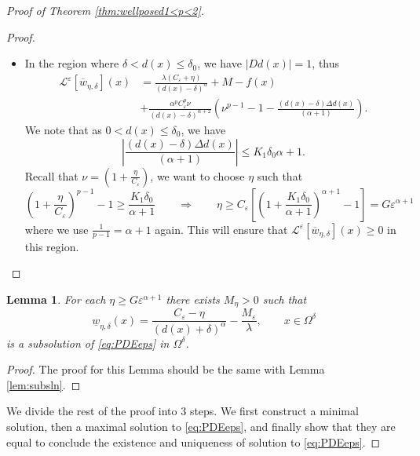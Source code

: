 \documentclass[11pt,reqno]{amsart}
\numberwithin{figure}{section}
\theoremstyle{plain}
\newtheorem{lem}[thm]{Lemma}
\theoremstyle{remark}
\numberwithin{equation}{section}
\begin{document}
\begin{appendices}
\begin{proof} [Proof of Theorem \ref{thm:wellposed1<p<2}]
\begin{proof}
\begin{itemize}
    \item In the region where $\delta < d(x)\leq \delta_0$, we have $|Dd(x)|=1$, thus
    \begin{align*}
         \mathcal{L}^\varepsilon\left[\overline{w}_{\eta,\delta}\right](x) &= \frac{\lambda(C_\varepsilon + \eta)}{(d(x)-\delta)^\alpha} + M - f(x)\\
         & + \frac{\alpha^p C_\varepsilon^p\nu }{(d(x)-\delta)^{\alpha+2}}\left(\nu^{p-1} - 1 - \frac{ (d(x)-\delta)\Delta d(x)}{(\alpha+1)}\right).
    \end{align*}
    We note that as $0<d(x)\leq \delta_0$, we have
    \begin{equation*}
        \left|\frac{(d(x)-\delta)\Delta  d(x)}{(\alpha+1)}\right| \leq {K_1\delta_0}{\alpha+1}.
    \end{equation*}
    Recall that $\nu = \left(1+\frac{\eta}{C_\varepsilon}\right)$, we want to choose $\eta$ such that
    \begin{equation*}
        \left(1+\frac{\eta}{C_\varepsilon}\right)^{p-1} - 1 \geq \frac{K_1\delta_0}{\alpha+1} \qquad\Longrightarrow\qquad \eta \geq C_\varepsilon\left[\left(1+\frac{K_1\delta_0}{\alpha+1}\right)^{\alpha+1}-1\right] = G\varepsilon^{\alpha+1}
    \end{equation*}
    where we use $\frac{1}{p-1} = \alpha+1$ again. This will ensure that $\mathcal{L}^\varepsilon\left[\overline{w}_{\eta,\delta}\right](x) \geq 0$ in this region.
\end{itemize}
\end{proof}

\begin{lem}\label{lem:supersln} For each $\eta\geq G\varepsilon^{\alpha+1}$ there exists $M_\eta > 0$ such that 
\begin{equation*}
    \underline{w}_{\eta, \delta}(x) = \frac{C_\varepsilon-\eta}{(d(x)+\delta)^\alpha} -\frac{M_\varepsilon}{\lambda}, \qquad x\in \Omega^\delta 
\end{equation*}
is a subsolution of \eqref{eq:PDEeps} in $\Omega^\delta$.
\end{lem}

\begin{proof} The proof for this Lemma should be the same with Lemma \ref{lem:subsln}.
\end{proof}

\noindent We divide the rest of the proof into 3 steps. We first construct a minimal solution, then a maximal solution to \eqref{eq:PDEeps}, and finally show that they are equal to conclude the existence and uniqueness of solution to \eqref{eq:PDEeps}.


\end{proof}
\end{appendices}
\end{document}
